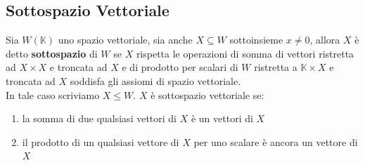 \documentclass{article}
\begin{document}
\subsection{Sottospazio Vettoriale}
Sia $W(\mathbb{K})$ uno spazio vettoriale, sia anche $X\subseteq W$
sottoinsieme $x \ne 0$, allora $X$ è detto \textbf{sottospazio} di $W$ se $X$
rispetta le operazioni di somma di vettori ristretta ad $X\times X$ e troncata
ad $X$ e di prodotto per scalari di $W$ ristretta a $\mathbb{K}\times X$ e
troncata ad $X$ soddisfa gli assiomi di spazio vettoriale. \\ In tale caso
scriviamo $X \leqslant W$. $X$ è sottospazio vettoriale se:
\begin{enumerate}
    \item la somma di due qualsiasi vettori di $X$ è un vettori di $X$
    \item il prodotto di un qualsiasi vettore di $X$ per uno scalare è ancora un vettore di $X$
\end{enumerate}
\end{document}
